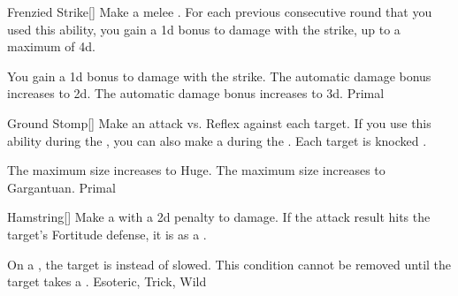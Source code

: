\lowercase{\hypertarget{maneuver:Frenzied Strike}{}}\label{maneuver:Frenzied Strike}
\hypertarget{maneuver:Frenzied Strike}{}
\begin{freeability}[Rank 1]{Frenzied Strike}[]
Make a melee .
For each previous consecutive round that you used this ability, you gain a \plus1d bonus to damage with the strike, up to a maximum of \plus4d.

\rankline
{} You gain a \plus1d bonus to damage with the strike.
 The automatic damage bonus increases to \plus2d.
 The automatic damage bonus increases to \plus3d.
 Primal
\end{freeability}
\vspace{0.25em}



\lowercase{\hypertarget{maneuver:Ground Stomp}{}}\label{maneuver:Ground Stomp}
\hypertarget{maneuver:Ground Stomp}{}
\begin{freeability}[Rank 3]{Ground Stomp}[]
Make an attack vs. Reflex against each target.
If you use this ability during the , you can also make a  during the .
\hit Each target is knocked \prone.

\rankline
{} The maximum size increases to Huge.
 The maximum size increases to Gargantuan.
 Primal
\end{freeability}
\vspace{0.25em}



\lowercase{\hypertarget{maneuver:Hamstring}{}}\label{maneuver:Hamstring}
\hypertarget{maneuver:Hamstring}{}
\begin{freeability}[Rank 3]{Hamstring}[]
Make a  with a \minus2d penalty to damage.
If the attack result hits the target's Fortitude defense,
it is  as a .

\rankline
{} On a , the target is  instead of slowed.
 This condition cannot be removed until the target takes a .
 Esoteric, Trick, Wild
\end{freeability}
\vspace{0.25em}



